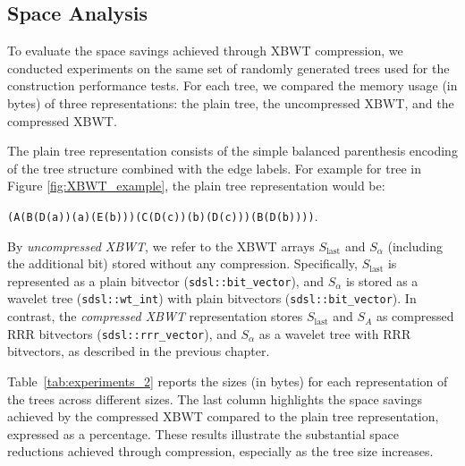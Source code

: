 \subsection{Space Analysis}
To evaluate the space savings achieved through XBWT compression, we conducted experiments on the same set of randomly generated trees used for the construction performance tests. For each tree, we compared the memory usage (in bytes) of three representations: the plain tree, the uncompressed XBWT, and the compressed XBWT.

The plain tree representation consists of the simple balanced parenthesis encoding of the tree structure combined with the edge labels. For example for tree in Figure \cref{fig:XBWT_example}, the plain tree representation would be:

\texttt{(A(B(D(a))(a)(E(b)))(C(D(c))(b)(D(c)))(B(D(b))))}.

By \emph{uncompressed XBWT}, we refer to the XBWT arrays $S_{\text{last}}$ and $S_{\alpha}$ (including the additional bit) stored without any compression. Specifically, $S_{\text{last}}$ is represented as a plain bitvector (\texttt{sdsl::bit\_vector}), and $S_{\alpha}$ is stored as a wavelet tree (\texttt{sdsl::wt\_int}) with plain bitvectors (\texttt{sdsl::bit\_vector}). In contrast, the \emph{compressed XBWT} representation stores $S_{\text{last}}$ and $S_{A}$ as compressed RRR bitvectors (\texttt{sdsl::rrr\_vector}), and $S_{\alpha}$ as a wavelet tree with RRR bitvectors, as described in the previous chapter.

Table~\cref{tab:experiments_2} reports the sizes (in bytes) for each representation of the trees across different sizes. The last column highlights the space savings achieved by the compressed XBWT compared to the plain tree representation, expressed as a percentage. These results illustrate the substantial space reductions achieved through compression, especially as the tree size increases.

